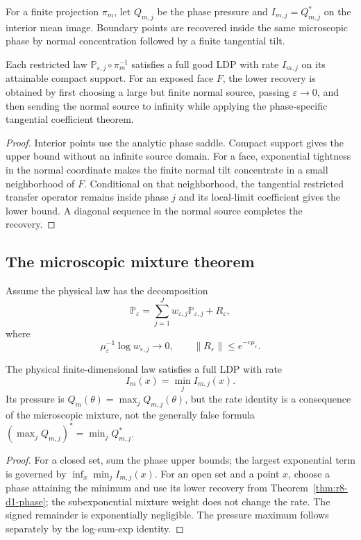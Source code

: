 For a finite projection $\pi_m$, let $Q_{m,j}$ be the phase pressure and
$I_{m,j}=Q_{m,j}^*$ on the interior mean image.  Boundary points are recovered
inside the same microscopic phase by normal concentration followed by a
finite tangential tilt.

\begin{theorem}
\label{thm:r8-d1-phase}
Each restricted law $\mathbb P_{\varepsilon,j}\circ\pi_m^{-1}$ satisfies a full
good LDP with rate $I_{m,j}$ on its attainable compact support.  For an exposed
face $F$, the lower recovery is obtained by first choosing a large but finite
normal source, passing $\varepsilon\to0$, and then sending the normal source to
infinity while applying the phase-specific tangential coefficient theorem.
\end{theorem}

\begin{proof}
Interior points use the analytic phase saddle.  Compact support gives the
upper bound without an infinite source domain.  For a face, exponential
tightness in the normal coordinate makes the finite normal tilt concentrate in
a small neighborhood of $F$.  Conditional on that neighborhood, the
tangential restricted transfer operator remains inside phase $j$ and its
local-limit coefficient gives the lower bound.  A diagonal sequence in the
normal source completes the recovery.
\end{proof}

\subsection{The microscopic mixture theorem}

Assume the physical law has the decomposition
\[
 \mathbb P_\varepsilon
 =\sum_{j=1}^Jw_{\varepsilon,j}\mathbb P_{\varepsilon,j}
 +R_\varepsilon,
\]
where
\[
 \mu_\varepsilon^{-1}\log w_{\varepsilon,j}\to0,
 \qquad
 \|R_\varepsilon\|\le e^{-c\mu_\varepsilon}.
\]

\begin{theorem}
\label{thm:r8-d1-mixture}
The physical finite-dimensional law satisfies a full LDP with rate
\[
 I_m(x)=\min_j I_{m,j}(x).
\]
Its pressure is $Q_m(\theta)=\max_jQ_{m,j}(\theta)$, but the rate identity is a
consequence of the microscopic mixture, not the generally false formula
$(\max_jQ_{m,j})^*=\min_jQ_{m,j}^*$.
\end{theorem}

\begin{proof}
For a closed set, sum the phase upper bounds; the largest exponential term is
governed by $\inf_x\min_jI_{m,j}(x)$.  For an open set and a point $x$, choose a
phase attaining the minimum and use its lower recovery from
Theorem~\ref{thm:r8-d1-phase}; the subexponential mixture weight does not change
the rate.  The signed remainder is exponentially negligible.  The pressure
maximum follows separately by the log-sum-exp identity.
\end{proof}

